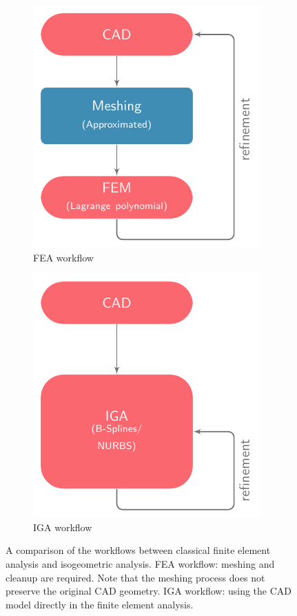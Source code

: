 \begin{figure}[ht]
	\captionsetup[subfigure]{labelformat=empty, font = footnotesize}
	\centering
	\begin{subfigure}[b]{0.47\textwidth}
		\centering
		\includegraphics[scale=1.2]{flow-chart-fem}
		\caption{FEA workflow}
	\end{subfigure}
	\begin{subfigure}[b]{0.47\textwidth}
		\centering
		\includegraphics[scale=1.2]{flow-chart-iga}
		\caption{IGA workflow}
	\end{subfigure}
	\caption{A comparison of the workflows between classical finite element analysis and isogeometric analysis. FEA workflow: meshing and cleanup are required. Note that the meshing process does not preserve the original CAD geometry. IGA workflow: using the CAD model directly in the finite element analysis. }
	\label{fig:flow_chart}
\end{figure}

